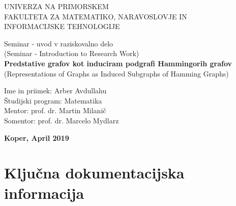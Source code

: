 \documentclass[12pt,a4paper,titlepage,openany]{report}
\begin{document}
\pagestyle{empty}
\begin{center}
\noindent \large UNIVERZA NA PRIMORSKEM\\
\large FAKULTETA ZA MATEMATIKO, NARAVOSLOVJE IN\\
INFORMACIJSKE TEHNOLOGIJE


\normalsize
\vspace{5.5cm}
Seminar - uvod v raziskovalno delo\\
(Seminar - Introduction to Research Work)\\
\textbf{\large Predstative grafov kot induciram podgrafi Hammingorih grafov}\\
\normalsize
(Representations of Graphs as Induced Subgraphs of Hamming Graphs)\\
\end{center}

\begin{flushleft}
\vspace{5cm}
\noindent Ime in priimek: Arber Avdullahu
\\
\noindent \v Studijski program: Matematika
\\
\noindent Mentor: prof. dr. Martin Milani\v c
\\
\noindent Somentor: prof. dr. Marcelo Mydlarz
\\
\end{flushleft}

\vspace{4cm}
\begin{center}
\large \textbf{Koper, April 2019}
\end{center}
\newpage

\pagestyle{fancy}

\section*{Klju\v cna dokumentacijska informacija}
\end{document}
